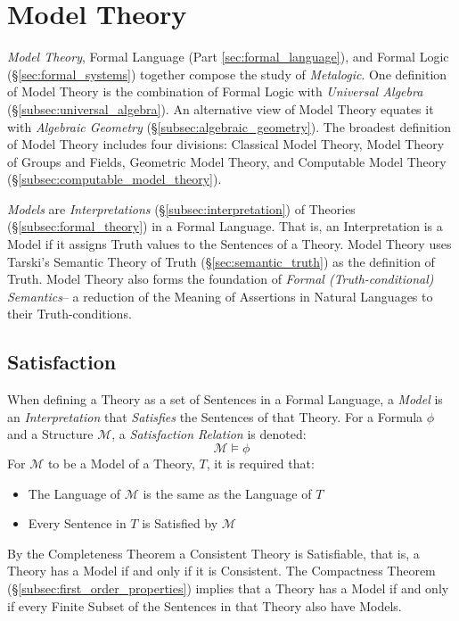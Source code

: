 \documentclass{article}
\begin{document}
\section{Model Theory}\label{sec:model_theory}

\emph{Model Theory}, Formal Language (Part \ref{sec:formal_language}),
and Formal Logic (\S\ref{sec:formal_systems}) together compose the
study of \emph{Metalogic}. One definition of Model Theory is the
combination of Formal Logic with \emph{Universal Algebra}
(\S\ref{subsec:universal_algebra}). An alternative view of Model
Theory equates it with \emph{Algebraic Geometry}
(\S\ref{subsec:algebraic_geometry}). The broadest definition of Model
Theory includes four divisions: Classical Model Theory, Model Theory
of Groups and Fields, Geometric Model Theory, and Computable Model
Theory (\S\ref{subsec:computable_model_theory}).

\emph{Models} are \emph{Interpretations}
(\S\ref{subsec:interpretation}) of Theories
(\S\ref{subsec:formal_theory}) in a Formal Language. That is, an
Interpretation is a Model if it assigns Truth values to the Sentences
of a Theory. Model Theory uses Tarski's Semantic Theory of Truth
(\S\ref{sec:semantic_truth}) as the definition of Truth. Model Theory
also forms the foundation of \emph{Formal (Truth-conditional)
  Semantics}-- a reduction of the Meaning of Assertions in Natural
Languages to their Truth-conditions.

\subsection{Satisfaction}\label{subsec:satisfaction}

When defining a Theory as a set of Sentences in a Formal Language, a
\emph{Model} is an \emph{Interpretation} that \emph{Satisfies} the
Sentences of that Theory. For a Formula $\phi$ and a Structure
$\mathcal{M}$, a \emph{Satisfaction Relation} is denoted:
\[
    \mathcal{M} \vDash \phi
\]
For $\mathcal{M}$ to be a Model of a Theory, $T$, it is required that:
\begin{itemize}
\item The Language of $\mathcal{M}$ is the same as the Language of $T$
\item Every Sentence in $T$ is Satisfied by $\mathcal{M}$
\end{itemize}
By the Completeness Theorem a Consistent Theory is Satisfiable, that
is, a Theory has a Model if and only if it is Consistent. The
Compactness Theorem (\S\ref{subsec:first_order_properties}) implies
that a Theory has a Model if and only if every Finite Subset of the
Sentences in that Theory also have Models.
\end{document}
